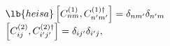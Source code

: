 \begin{equation}
\begin{array}{l}
\lb{heisa}
\left[C_{nm}^{(1)}, C_{n'm'}^{(1)\dag}
\right]=\delta_{nm'}\delta_{n'm}\\
\left[C_{ij}^{(2)}, C_{i'j'}^{(2)\dag}
\right]=\delta_{ij'}\delta_{i'j},
\end{array}
\end{equation}

